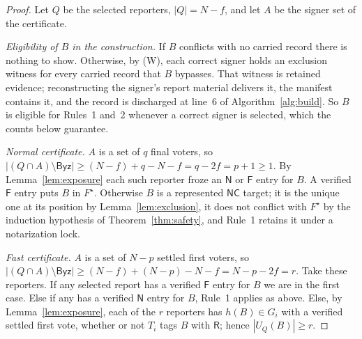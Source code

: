 \documentclass[conference]{IEEEtran}
\newcommand{\NC}{\mathsf{NC}}
\newcommand{\tagR}{\mathsf{R}}
\newcommand{\tagN}{\mathsf{N}}
\newcommand{\tagF}{\mathsf{F}}
\newcommand{\Byz}{\mathsf{Byz}}
\begin{document}
\begin{proof}
Let $Q$ be the selected reporters, $|Q|=N-f$, and let $A$ be the signer set of the certificate.

\emph{Eligibility of $B$ in the construction.} If $B$ conflicts with no carried record there is nothing to show. Otherwise, by (W), each correct signer holds an exclusion witness for every carried record that $B$ bypasses. That witness is retained evidence; reconstructing the signer's report material delivers it, the manifest contains it, and the record is discharged at line~6 of Algorithm~\ref{alg:build}. So $B$ is eligible for Rules~1 and~2 whenever a correct signer is selected, which the counts below guarantee.

\emph{Normal certificate.} $A$ is a set of $q$ final voters, so $|(Q\cap A)\setminus\Byz|\ge(N-f)+q-N-f=q-2f=p+1\ge1$. By Lemma~\ref{lem:exposure} each such reporter froze an $\tagN$ or $\tagF$ entry for $B$. A verified $\tagF$ entry puts $B$ in $F^\star$. Otherwise $B$ is a represented $\NC$ target; it is the unique one at its position by Lemma~\ref{lem:exclusion}, it does not conflict with $F^\star$ by the induction hypothesis of Theorem~\ref{thm:safety}, and Rule~1 retains it under a notarization lock.

\emph{Fast certificate.} $A$ is a set of $N-p$ settled first voters, so $|(Q\cap A)\setminus\Byz|\ge(N-f)+(N-p)-N-f=N-p-2f=r$. Take these reporters. If any selected report has a verified $\tagF$ entry for $B$ we are in the first case. Else if any has a verified $\tagN$ entry for $B$, Rule~1 applies as above. Else, by Lemma~\ref{lem:exposure}, each of the $r$ reporters has $h(B)\in G_i$ with a verified settled first vote, whether or not $T_i$ tags $B$ with $\tagR$; hence $|U_Q(B)|\ge r$.


\end{proof}
\end{document}
